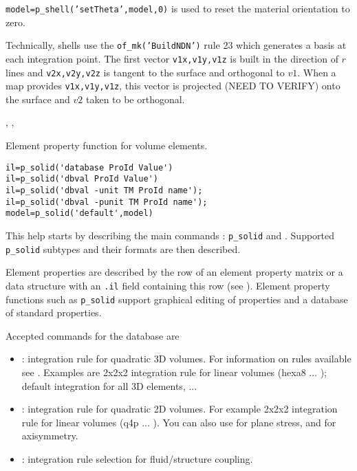 {\tt model=p\_shell('setTheta',model,0)} is used to reset the material orientation to zero.


Technically, shells use the {\tt of\_mk('BuildNDN')} rule 23 which generates a basis at each integration point. The first vector {\tt v1x,v1y,v1z} is built in the direction of $r$ lines and {\tt v2x,v2y,v2z} is tangent to the surface and orthogonal to $v1$. When a  map provides {\tt v1x,v1y,v1z}, this vector is projected (NEED TO VERIFY) onto the surface and $v2$ taken to be orthogonal. 



  , , \femat



Element property function for volume elements.

\rsyntax\begin{verbatim}
il=p_solid('database ProId Value')
il=p_solid('dbval ProId Value')
il=p_solid('dbval -unit TM ProId name');
il=p_solid('dbval -punit TM ProId name');
model=p_solid('default',model)
\end{verbatim}




This help starts by describing the main commands : {\tt p\_solid}  and . Supported {\tt p\_solid} subtypes and their formats are then described.


Element properties are described by the row of an element property matrix or a data structure with an {\tt .il} field containing this row (see ). Element property functions such as {\tt p\_solid} support graphical editing of properties and a database of standard properties. 

Accepted commands for the database are 
%
\begin{itemize}
\item {} :  integration rule for quadratic 3D volumes. For information on rules available see . Examples are   2x2x2 integration rule for linear volumes (hexa8 ... );  default integration for all 3D elements, ...
\item{} :   integration rule for quadratic 2D volumes. For example  2x2x2 integration rule for linear volumes (q4p ... ). You can also use  for plane stress, and  for axisymmetry.
\item{} : integration rule selection for fluid/structure coupling.
\end{itemize}

